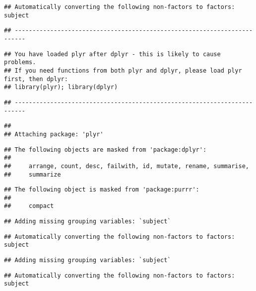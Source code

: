 \documentclass[]{article}
\begin{document}
\begin{verbatim}
## Automatically converting the following non-factors to factors: subject
\end{verbatim}

\begin{verbatim}
## -------------------------------------------------------------------------
\end{verbatim}

\begin{verbatim}
## You have loaded plyr after dplyr - this is likely to cause problems.
## If you need functions from both plyr and dplyr, please load plyr first, then dplyr:
## library(plyr); library(dplyr)
\end{verbatim}

\begin{verbatim}
## -------------------------------------------------------------------------
\end{verbatim}

\begin{verbatim}
## 
## Attaching package: 'plyr'
\end{verbatim}

\begin{verbatim}
## The following objects are masked from 'package:dplyr':
## 
##     arrange, count, desc, failwith, id, mutate, rename, summarise,
##     summarize
\end{verbatim}

\begin{verbatim}
## The following object is masked from 'package:purrr':
## 
##     compact
\end{verbatim}

\begin{verbatim}
## Adding missing grouping variables: `subject`
\end{verbatim}

\begin{verbatim}
## Automatically converting the following non-factors to factors: subject
\end{verbatim}

\begin{verbatim}
## Adding missing grouping variables: `subject`
\end{verbatim}

\begin{verbatim}
## Automatically converting the following non-factors to factors: subject
\end{verbatim}
\end{document}
